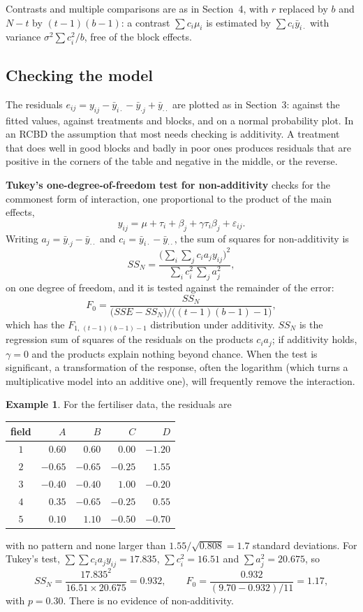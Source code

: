 \documentclass[11pt,a4paper]{article}
\numberwithin{equation}{section}
\theoremstyle{definition}
\newtheorem{exa}[thm]{Example}
\begin{document}
Contrasts and multiple comparisons are as in Section~4, with $r$ replaced by $b$ and $N - t$ by $(t - 1)(b - 1)$: a contrast $\sum c_i\mu_i$ is estimated by
$\sum c_i\bar y_{i\cdot}$ with variance $\sigma^2\sum c_i^2/b$, free of the block effects.

\subsection{Checking the model}
The residuals $e_{ij} = y_{ij} - \bar y_{i\cdot} - \bar y_{\cdot j} + \bar y_{\cdot\cdot}$ are plotted as in Section~3: against the fitted values, against treatments and blocks, and on a
normal probability plot. In an RCBD the assumption that most needs checking is additivity. A treatment that does well in good blocks and badly
in poor ones produces residuals that are positive in the corners of the table and negative in the middle, or the reverse.

\textbf{Tukey's one-degree-of-freedom test for non-additivity} checks for the commonest form of interaction, one proportional to the product of the
main effects,
\[
y_{ij} = \mu + \tau_i + \beta_j + \gamma\tau_i\beta_j + \varepsilon_{ij} .
\]
Writing $a_j = \bar y_{\cdot j} - \bar y_{\cdot\cdot}$ and $c_i = \bar y_{i\cdot} - \bar y_{\cdot\cdot}$, the sum of squares for non-additivity is
\[
SS_N = \frac{\bigl(\sum_i\sum_jc_ia_jy_{ij}\bigr)^2}{\sum_ic_i^2\,\sum_ja_j^2} ,
\]
on one degree of freedom, and it is tested against the remainder of the error:
\[
F_0 = \frac{SS_N}{\bigl(SSE - SS_N\bigr)/\bigl((t - 1)(b - 1) - 1\bigr)} ,
\]
which has the $F_{1,\,(t-1)(b-1)-1}$ distribution under additivity.
$SS_N$ is the regression sum of squares of the residuals on the products $c_ia_j$; if additivity holds, $\gamma = 0$ and the products explain nothing beyond
chance. When the test is significant, a transformation of the response, often the logarithm (which turns a multiplicative model into an
additive one), will frequently remove the interaction.

\begin{exa}
For the fertiliser data, the residuals are
\begin{center}
\begin{tabular}{c|rrrr}
field & $A$ & $B$ & $C$ & $D$ \\
\hline
$1$ & $0.60$ & $0.60$ & $0.00$ & $-1.20$ \\
$2$ & $-0.65$ & $-0.65$ & $-0.25$ & $1.55$ \\
$3$ & $-0.40$ & $-0.40$ & $1.00$ & $-0.20$ \\
$4$ & $0.35$ & $-0.65$ & $-0.25$ & $0.55$ \\
$5$ & $0.10$ & $1.10$ & $-0.50$ & $-0.70$
\end{tabular}
\end{center}
with no pattern and none larger than $1.55/\sqrt{0.808} = 1.7$ standard deviations. For Tukey's test, $\sum\sum c_ia_jy_{ij} = 17.835$, $\sum c_i^2 = 16.51$ and $\sum a_j^2 = 20.675$, so
\[
SS_N = \frac{17.835^2}{16.51 \times 20.675} = 0.932 , \qquad F_0 = \frac{0.932}{(9.70 - 0.932)/11} = 1.17 ,
\]
with $p = 0.30$. There is no evidence of non-additivity.
\end{exa}
\end{document}
